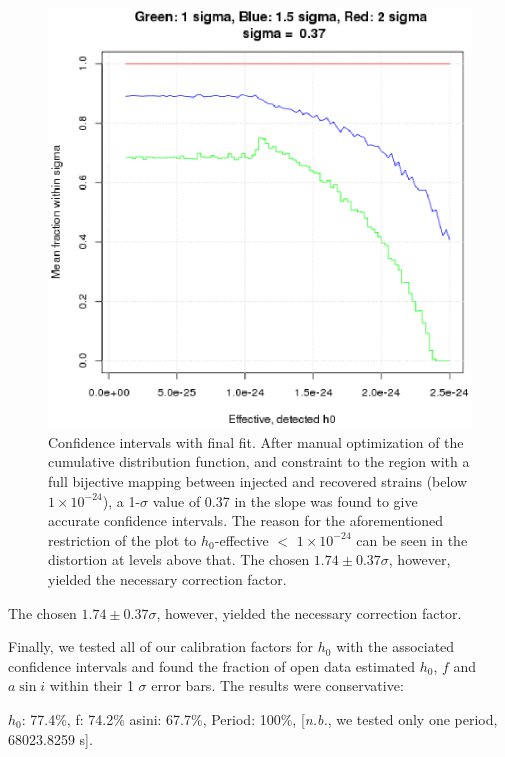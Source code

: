 \begin{figure}
\begin{center}
\includegraphics[trim=0 10 10 5, clip, width=0.72\paperwidth,height=0.48\paperheight]{PlotSigmaDiffVsH0Eff.eps}
\caption{Confidence intervals with final fit. After manual optimization of the cumulative distribution function, and constraint to the region with a full bijective mapping between injected and recovered strains (below $1 \times 10^{-24}$), a 1-$\sigma$ value of 0.37 in the slope was found to give accurate confidence intervals.
The reason for the aforementioned restriction of the plot to $h_0$-effective $<$ $1 \times 10^{-24}$ can be seen in the distortion at levels above that. 
The chosen $1.74 \pm 0.37 \sigma$, however, yielded the necessary correction factor. \label{fig:plotsigmadiffvsh0eff}
}
\end{center}
\end{figure}

The chosen $1.74 \pm 0.37 \sigma$, however, yielded the necessary correction factor.

Finally, we tested all of our calibration factors for $h_0$ with the associated confidence intervals and found the fraction of open data estimated $h_0$, $f$ and $a \sin i$ within their 1 $\sigma$ error bars. The results were conservative:

$h_0$: 77.4\%,
f: 74.2\%
asini: 67.7\%,
Period: 100\%, [\textit{n.b.}, we tested only one period, 68023.8259 s].

